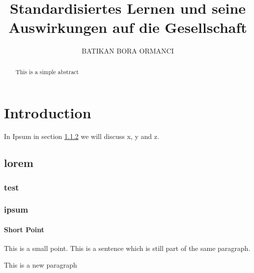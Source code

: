\documentclass[a4paper]{article}
\title{Standardisiertes Lernen und seine Auswirkungen auf die Gesellschaft}
\author{BATIKAN BORA ORMANCI}
\begin{document}
	\maketitle
\begin{abstract}
	\lipsum[1]
	This is a simple abstract
	
\end{abstract}

\section{Introduction}
In Ipsum in section \ref{sec:ipsum} we will discuss x, y and z.
\subsection{lorem}
\lipsum[1]
\subsubsection{test}
\subsubsection{ipsum}\label{sec:ipsum}
\lipsum[2]

\paragraph{Short Point}
This is a small point. This is a sentence which is still part of the same paragraph.

This is a new paragraph
\end{document}
